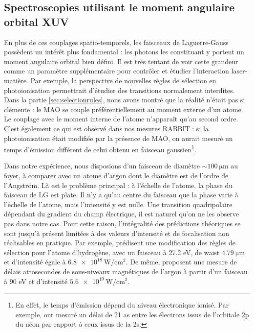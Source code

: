 \subsection{Spectroscopies utilisant le moment angulaire orbital XUV}
En plus de ces couplages spatio-temporels, les faisceaux de Laguerre-Gauss possèdent un intérêt plus fondamental : les photons les constituant y portent un moment angulaire orbital bien défini. Il est très tentant de voir cette grandeur comme un paramètre supplémentaire pour contrôler et étudier l'interaction laser-matière. Par exemple, la perspective de nouvelles règles de sélection en photoionisation permettrait d'étudier des transitions normalement interdites. Dans la partie \ref{sec:selectionrules}, nous avons montré que la réalité n'était pas si clémente : le MAO se couple préférentiellement au moment externe d'un atome. Le couplage avec le moment interne de l'atome n'apparaît qu'au second ordre. C'est également ce qui est observé dans nos mesures RABBIT : si la photoionisation était modifiée par la présence de MAO, on aurait mesuré un temps d'émission différent de celui obtenu en faisceau gaussien\footnote{En effet, le temps d'émission dépend du niveau électronique ionisé. Par exemple,  ont mesuré un délai de 21 as entre les électrons issus de l'orbitale 2p du néon par rapport à ceux issus de la 2s.}.

Dans notre expérience, nous disposions d'un faisceau de diamètre $\sim \SI{100}{\micro\metre}$ au foyer, à comparer avec un atome d'argon dont le diamètre est de l'ordre de l'Angström. Là est le problème principal : à l'échelle de l'atome, la phase du faisceau de LG est plate. Il n'y a qu'au centre du faisceau que la phase varie à l'échelle de l'atome, mais l'intensité y est nulle. Une transition quadripolaire dépendant du gradient du champ électrique, il est naturel qu'on ne les observe pas  dans notre cas. Pour cette raison, l'intégralité des prédictions théoriques se sont jusqu'à présent limitées à des valeurs d'intensité et de focalisation non réalisables en pratique. Par exemple,  prédisent une modification des règles de sélection pour l'atome d'hydrogène, avec un faisceau à 27.2 eV, de waist $\SI{4.79}{\micro\metre}$ et d'intensité égale à $\SI{6.8e18}{\W\per\centi\metre\squared}$. De même,  proposent une mesure de délais attosecondes de sous-niveaux magnétiques de l'argon à partir d'un faisceau à 90 eV et d'intensité $\SI{5.6e19}{\W\per\centi\metre\squared}$.

